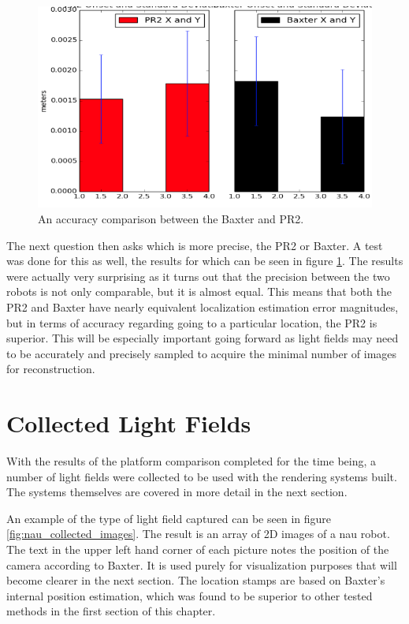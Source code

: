 \documentclass[12pt]{report}
\begin{document}
\begin{figure}[!ht]
	\centering
	\includegraphics[scale=0.45]{bax_pr2_compare.png}
	\caption{An accuracy comparison between the Baxter and PR2.}
	\label{fig:bax_and_pr2_compare}
\end{figure}

The next question then asks which is more precise, the PR2 or Baxter. A test was done for this as well, the results for which can be seen in figure \ref{fig:bax_and_pr2_compare}. The results were actually very surprising as it turns out that the precision between the two robots is not only comparable, but it is almost equal. This means that both the PR2 and Baxter have nearly equivalent localization estimation error magnitudes, but in terms of accuracy regarding going to a particular location, the PR2 is superior. This will be especially important going forward as light fields may need to be accurately and precisely sampled to acquire the minimal number of images for reconstruction.

\section{Collected Light Fields}
With the results of the platform comparison completed for the time being, a number of light fields were collected to be used with the rendering systems built. The systems themselves are covered in more detail in the next section. 

An example of the type of light field captured can be seen in figure \ref{fig:nau_collected_images}. The result is an array of 2D images of a nau robot. The text in the upper left hand corner of each picture notes the position of the camera according to Baxter. It is used purely for visualization purposes that will become clearer in the next section. The location stamps are based on Baxter's internal position estimation, which was found to be superior to other tested methods in the first section of this chapter.
\end{document}
